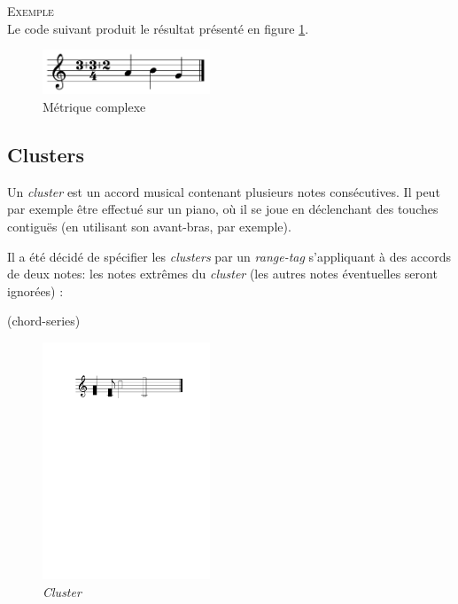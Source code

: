 \documentclass{article}
\newenvironment{gmncode}	{\vspace{-2mm}\small\verbatim}{\endverbatim\vspace{-2mm}}
\newcommand{\exemple}		{\vspace{2mm}\hspace*{-6mm}\textsc{Exemple}}
\begin{document}
\exemple\\
Le code suivant produit le résultat présenté en figure \ref{fig:complexMeter}.
\begin{gmncode}
[
  \meter<"3+3+2/4"> a b g
]
\end{gmncode}

\begin{figure}[h]
\centering
\includegraphics[width=50mm]{img/partitions/complexMeter.pdf}
\caption{Métrique complexe}
\label{fig:complexMeter}
\end{figure}

\subsection{Clusters}\label{subsec:clusters}

Un \emph{cluster} est un accord musical contenant plusieurs notes consécutives. Il peut par exemple être effectué sur un piano, où il se joue en déclenchant des touches contiguës (en utilisant son avant-bras, par exemple).

Il a été décidé de spécifier les \emph{clusters} par un \emph{range-tag} s'appliquant à des accords de deux notes: les notes extrêmes du \emph{cluster} (les autres notes éventuelles seront ignorées) :

\begin{gmncode}
(chord-series)
\end{gmncode}


%
\begin{figure}[h]
\centering
\begin{gmncode}
[
  \cluster({a, d} {c/8, f}
    {a/2, d2} {f/1, c1})
]
\end{gmncode}
\includegraphics[width=50mm]{img/partitions/cluster.pdf}
\caption{\emph{Cluster}}
\label{fig:cluster}
\end{figure}
%
\end{document}

